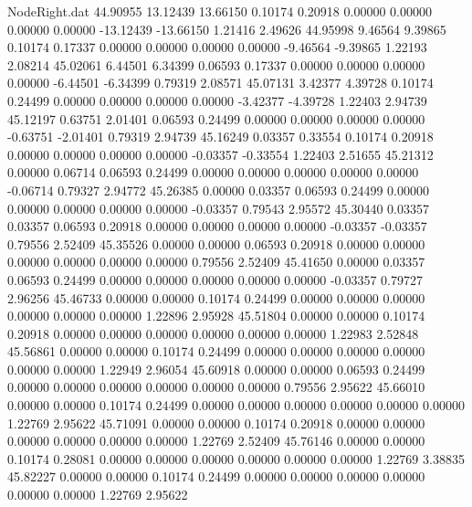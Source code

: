\begin{filecontents}{NodeRight.dat}
  44.90955   13.12439   13.66150     0.10174    0.20918    0.00000    0.00000    0.00000    0.00000  -13.12439  -13.66150    1.21416    2.49626
  44.95998    9.46564    9.39865     0.10174    0.17337    0.00000    0.00000    0.00000    0.00000   -9.46564   -9.39865    1.22193    2.08214
  45.02061    6.44501    6.34399     0.06593    0.17337    0.00000    0.00000    0.00000    0.00000   -6.44501   -6.34399    0.79319    2.08571
  45.07131    3.42377    4.39728     0.10174    0.24499    0.00000    0.00000    0.00000    0.00000   -3.42377   -4.39728    1.22403    2.94739
  45.12197    0.63751    2.01401     0.06593    0.24499    0.00000    0.00000    0.00000    0.00000   -0.63751   -2.01401    0.79319    2.94739
  45.16249    0.03357    0.33554     0.10174    0.20918    0.00000    0.00000    0.00000    0.00000   -0.03357   -0.33554    1.22403    2.51655
  45.21312    0.00000    0.06714     0.06593    0.24499    0.00000    0.00000    0.00000    0.00000    0.00000   -0.06714    0.79327    2.94772
  45.26385    0.00000    0.03357     0.06593    0.24499    0.00000    0.00000    0.00000    0.00000    0.00000   -0.03357    0.79543    2.95572
  45.30440    0.03357    0.03357     0.06593    0.20918    0.00000    0.00000    0.00000    0.00000   -0.03357   -0.03357    0.79556    2.52409
  45.35526    0.00000    0.00000     0.06593    0.20918    0.00000    0.00000    0.00000    0.00000    0.00000    0.00000    0.79556    2.52409
  45.41650    0.00000    0.03357     0.06593    0.24499    0.00000    0.00000    0.00000    0.00000    0.00000   -0.03357    0.79727    2.96256
  45.46733    0.00000    0.00000     0.10174    0.24499    0.00000    0.00000    0.00000    0.00000    0.00000    0.00000    1.22896    2.95928
  45.51804    0.00000    0.00000     0.10174    0.20918    0.00000    0.00000    0.00000    0.00000    0.00000    0.00000    1.22983    2.52848
  45.56861    0.00000    0.00000     0.10174    0.24499    0.00000    0.00000    0.00000    0.00000    0.00000    0.00000    1.22949    2.96054
  45.60918    0.00000    0.00000     0.06593    0.24499    0.00000    0.00000    0.00000    0.00000    0.00000    0.00000    0.79556    2.95622
  45.66010    0.00000    0.00000     0.10174    0.24499    0.00000    0.00000    0.00000    0.00000    0.00000    0.00000    1.22769    2.95622
  45.71091    0.00000    0.00000     0.10174    0.20918    0.00000    0.00000    0.00000    0.00000    0.00000    0.00000    1.22769    2.52409
  45.76146    0.00000    0.00000     0.10174    0.28081    0.00000    0.00000    0.00000    0.00000    0.00000    0.00000    1.22769    3.38835
  45.82227    0.00000    0.00000     0.10174    0.24499    0.00000    0.00000    0.00000    0.00000    0.00000    0.00000    1.22769    2.95622

\end{filecontents}
